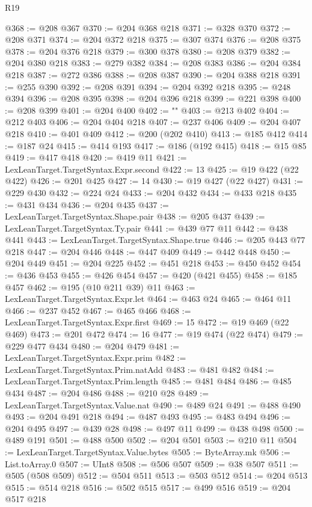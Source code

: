 \begin{lexlean}{R19}
\begin{coremodule}
@368 := @208 @367
@370 := @204 @368 @218
@371 := @328 @370
@372 := @208 @371
@374 := @204 @372 @218
@375 := @307 @374
@376 := @208 @375
@378 := @204 @376 @218
@379 := @300 @378
@380 := @208 @379
@382 := @204 @380 @218
@383 := @279 @382
@384 := @208 @383
@386 := @204 @384 @218
@387 := @272 @386
@388 := @208 @387
@390 := @204 @388 @218
@391 := @255 @390
@392 := @208 @391
@394 := @204 @392 @218
@395 := @248 @394
@396 := @208 @395
@398 := @204 @396 @218
@399 := @221 @398
@400 := @208 @399
@401 := @204 @400
@402 := ""
@403 := @213 @402
@404 := @212 @403
@406 := @204 @404 @218
@407 := @237 @406
@409 := @204 @407 @218
@410 := @401 @409
@412 := @200 (@202 @410)
@413 := @185 @412
@414 := @187 @24
@415 := @414 @193
@417 := @186 (@192 @415)
@418 := @15 @85
@419 := @417 @418
@420 := @419 @11
@421 := LexLeanTarget.TargetSyntax.Expr.second
@422 := 13
@425 := @19 @422 (@22 @422)
@426 := @201 @425
@427 := 14
@430 := @19 @427 (@22 @427)
@431 := @229 @430
@432 := @224 @24
@433 := @204 @432
@434 := @433 @218
@435 := @431 @434
@436 := @204 @435
@437 := LexLeanTarget.TargetSyntax.Shape.pair
@438 := @205 @437
@439 := LexLeanTarget.TargetSyntax.Ty.pair
@441 := @439 @77 @11
@442 := @438 @441
@443 := LexLeanTarget.TargetSyntax.Shape.true
@446 := @205 @443 @77 @218
@447 := @204 @446
@448 := @447 @409
@449 := @442 @448
@450 := @204 @449
@451 := @204 @225
@452 := @451 @218
@453 := @450 @452
@454 := @436 @453
@455 := @426 @454
@457 := @420 (@421 @455)
@458 := @185 @457
@462 := @195 (@10 @211 @39) @11
@463 := LexLeanTarget.TargetSyntax.Expr.let
@464 := @463 @24
@465 := @464 @11
@466 := @237 @452
@467 := @465 @466
@468 := LexLeanTarget.TargetSyntax.Expr.first
@469 := 15
@472 := @19 @469 (@22 @469)
@473 := @201 @472
@474 := 16
@477 := @19 @474 (@22 @474)
@479 := @229 @477 @434
@480 := @204 @479
@481 := LexLeanTarget.TargetSyntax.Expr.prim
@482 := LexLeanTarget.TargetSyntax.Prim.natAdd
@483 := @481 @482
@484 := LexLeanTarget.TargetSyntax.Prim.length
@485 := @481 @484
@486 := @485 @434
@487 := @204 @486
@488 := @210 @28
@489 := LexLeanTarget.TargetSyntax.Value.nat
@490 := @489 @24
@491 := @488 @490
@493 := @204 @491 @218
@494 := @487 @493
@495 := @483 @494
@496 := @204 @495
@497 := @439 @28
@498 := @497 @11
@499 := @438 @498
@500 := @489 @191
@501 := @488 @500
@502 := @204 @501
@503 := @210 @11
@504 := LexLeanTarget.TargetSyntax.Value.bytes
@505 := ByteArray.mk
@506 := List.toArray.{0}
@507 := UInt8
@508 := @506 @507
@509 := @38 @507
@511 := @505 (@508 @509)
@512 := @504 @511
@513 := @503 @512
@514 := @204 @513
@515 := @514 @218
@516 := @502 @515
@517 := @499 @516
@519 := @204 @517 @218

\end{coremodule}
\end{lexlean}
